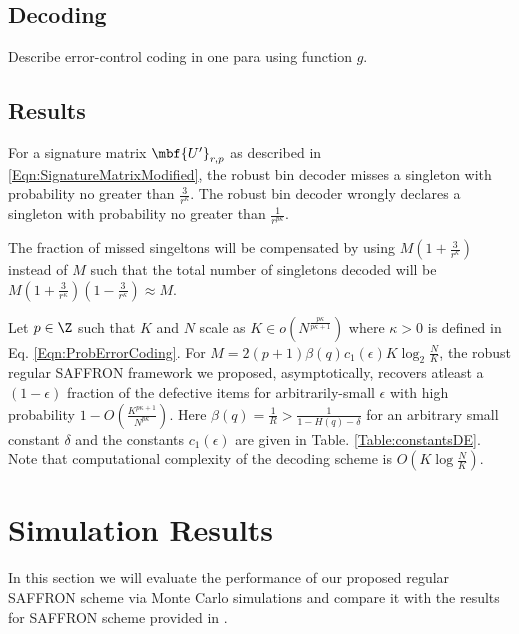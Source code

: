 \documentclass[conference,twocolumn]{IEEEtran}
\begin{document}
\subsection*{Decoding}
Describe error-control coding in one para using function $g$.


\subsection*{Results}
\begin{lemma}
For a signature matrix $\mbf{U'}_{r,p}$ as described in \eqref{Eqn:SignatureMatrixModified}, the robust bin decoder misses a singleton with probability no greater than $\frac{3}{r^{\kappa}}$. The robust bin decoder wrongly declares a singleton with probability no greater than $\frac{1}{r^{p\kappa}}$.
\end{lemma}
The fraction of missed singeltons will be compensated by using $M(1+\frac{3}{r^{\kappa}})$ instead of $M$ such that the total number of singletons decoded will be $M(1+\frac{3}{r^{\kappa}})(1-\frac{3}{r^{\kappa}})\approx M$.

\begin{theorem}
Let $p\in\Z$ such that $K$ and $N$ scale as $K\in o\left(N^{\frac{p\kappa}{p\kappa+1}}\right)$ where $\kappa>0$ is defined in Eq. \eqref{Eqn:ProbErrorCoding}. For $M=2(p+1)\beta(q)c_1(\epsilon)K \log_{2}\frac{N}{K}$, the robust regular SAFFRON framework we proposed, asymptotically, recovers atleast a $(1-\epsilon)$ fraction of the defective items for arbitrarily-small $\epsilon$ with high probability $1-O\left(\frac{K^{p\kappa+1}}{N^{p\kappa}}\right)$. Here $\beta(q)=\frac{1}{R}>\frac{1}{1-H(q)-\delta}$ for an arbitrary small constant $\delta$ and the constants $c_1(\epsilon)$ are given in Table. \ref{Table:constantsDE}. Note that computational complexity of the decoding scheme is $O(K\log \frac{N}{K})$.
\end{theorem}

\section{Simulation Results}
In this section we will evaluate the performance of our proposed regular SAFFRON scheme via Monte Carlo simulations and compare it with the results for SAFFRON scheme provided in \cite{lee2015saffron}.
\end{document}
